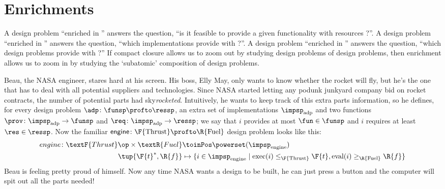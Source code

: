 

\section{Enrichments}
\label{sec:enriched}
A design problem ``enriched in \Bool'' answers the question, ``is it feasible to provide a given functionality \fun with resources \res?''. A design problem ``enriched in \Set'' answers the question, ``which implementations provide \fun with \res?''. A design problem ``enriched in \DP'' answers the question, ``which design problems provide \fun with \res?'' If compact closure allows us to zoom out by studying design problems of design problems, then enrichment allows us to zoom in by studying the `subatomic' composition of design problems.

\begin{example}
  \label{ex:dpi_example}
  Beau, the NASA engineer, stares hard at his screen. His boss, Elly May, only wants to know whether the rocket will fly, but he's the one that has to deal with all potential suppliers and technologies. Since NASA started letting any podunk junkyard company bid on rocket contracts, the number of potential parts had sky\emph{rocketed}. Intuitively, he wants to keep track of this extra parts information, so he defines, for every design problem $\adp \colon \funsp \profto \ressp$, an extra set of implementations $\impsp_\text{adp}$ and two functions $\prov\colon \impsp_\text{adp} \to \funsp$ and  $\req\colon \impsp_\text{adp} \to \ressp$; we say that $i$ provides at most $\fun \in \funsp$ and $i$ requires at least $\res \in \ressp$. Now the familiar $\mathsf{engine} \colon \F{\text{Thrust}} \profto \R{\text{Fuel}}$ design problem looks like this:
  \begin{equation*}
    \begin{aligned}
      engine \colon \textF{Thrust}\op \times \textR{Fuel} &\toinPos \powerset(\impsp_\text{engine}) \\
      \tup{\F{t}^*,\R{f}} &\mapsto \{ i \in \impsp_\text{engine} \mid \text{exec}(i) \leq_\F{\text{Thrust}} \F{t}, \text{eval}(i) \geq_\R{\text{Fuel}} \R{f} \}
    \end{aligned}
  \end{equation*}
  Beau is feeling pretty proud of himself. Now any time NASA wants a design to be built, he can just press a button and the computer will spit out all the parts needed!
\end{example}

